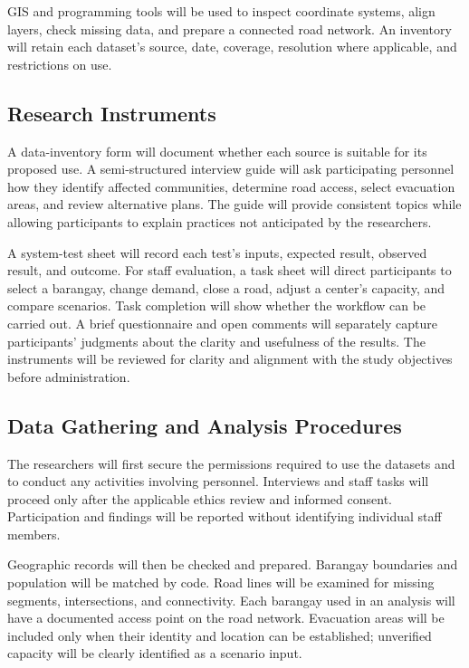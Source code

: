GIS and programming tools will be used to inspect coordinate systems, align layers, check missing data, and prepare a connected road network. An inventory will retain each dataset's source, date, coverage, resolution where applicable, and restrictions on use.

\subsection{Research Instruments}

A data-inventory form will document whether each source is suitable for its proposed use. A semi-structured interview guide will ask participating personnel how they identify affected communities, determine road access, select evacuation areas, and review alternative plans. The guide will provide consistent topics while allowing participants to explain practices not anticipated by the researchers.

A system-test sheet will record each test's inputs, expected result, observed result, and outcome. For staff evaluation, a task sheet will direct participants to select a barangay, change demand, close a road, adjust a center's capacity, and compare scenarios. Task completion will show whether the workflow can be carried out. A brief questionnaire and open comments will separately capture participants' judgments about the clarity and usefulness of the results. The instruments will be reviewed for clarity and alignment with the study objectives before administration.

\subsection{Data Gathering and Analysis Procedures}

The researchers will first secure the permissions required to use the datasets and to conduct any activities involving personnel. Interviews and staff tasks will proceed only after the applicable ethics review and informed consent. Participation and findings will be reported without identifying individual staff members.

Geographic records will then be checked and prepared. Barangay boundaries and population will be matched by code. Road lines will be examined for missing segments, intersections, and connectivity. Each barangay used in an analysis will have a documented access point on the road network. Evacuation areas will be included only when their identity and location can be established; unverified capacity will be clearly identified as a scenario input.

